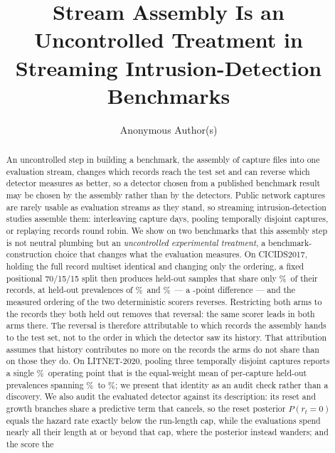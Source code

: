 \documentclass[manuscript,anonymous,review]{acmart}
\begin{document}
\title{Stream Assembly Is an Uncontrolled Treatment in Streaming
Intrusion-Detection Benchmarks}

\author{Anonymous Author(s)}

\begin{abstract}
An uncontrolled step in building a benchmark, the assembly of capture files into
one evaluation stream, changes which records reach the test set and can reverse
which detector measures as better, so a detector chosen from a published
benchmark result may be chosen by the assembly rather than by the detectors.
Public network captures are rarely usable as evaluation streams as they stand,
so streaming intrusion-detection studies assemble them: interleaving capture
days, pooling temporally disjoint captures, or replaying records round robin.
We show on two benchmarks that this assembly step is not neutral plumbing but
an \emph{uncontrolled experimental treatment}, a benchmark-construction choice
that changes what the evaluation measures. On CICIDS2017, holding the full
record multiset identical and changing only the ordering, a fixed positional
70/15/15 split then produces held-out samples that share only
\CicidsHeldoutOverlapPct\%\ of their records, at held-out prevalences of
\SFourCicidsNaturalTestPrev\%\ and \SFourCicidsInterleavedTestPrev\%\ --- a
\SFourCicidsPrevShiftAbsPp-point difference --- and the measured ordering of
the two deterministic scorers reverses. Restricting both arms to the
\RevSharedRecords{} records they both held out removes that reversal: the same
scorer leads in both arms there. The reversal is therefore attributable to
which records the assembly hands to the test set, not to the order in which
the detector saw its history. That attribution assumes that history contributes
no more on the records the arms do not share than on those they do.
On LITNET-2020, pooling three temporally disjoint captures reports a single
\SFourLitnetPooledTestPrev\%\ operating point that is the equal-weight mean of
per-capture held-out prevalences spanning \SFourLitnetSpamTestPrev\%\ to
\SFourLitnetUdpFloodTestPrev\%; we present that identity as an audit check
rather than a discovery. We also audit the evaluated detector against its
description: its reset and growth branches share a predictive term that
cancels, so the reset posterior $P(r_t{=}0)$ equals the hazard rate exactly
below the run-length cap, while the evaluations spend nearly all their length at or
beyond that cap, where the posterior instead wanders; and the score the

\end{abstract}
\end{document}
